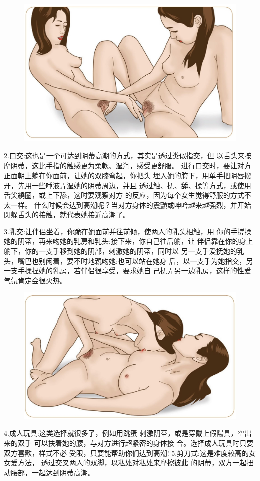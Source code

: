 \documentclass[12pt,UTF8]{ctexbook}
\begin{document}
\begin{figure}[htbp]
	\centering
	\includegraphics[width=0.7\linewidth]{10}
	\caption{}
	\label{fig:1}
\end{figure}

2.口交:这也是一个可达到阴蒂高潮的方式，其实是透过类似指交，但
以舌头来按摩阴蒂，这比手指的触感更为柔軟、湿润，感受更舒服。
进行口交时，要让对方正面朝上躺在你面前，让她的双膝弯起，你把头
埋入她的胯下，用单手把阴唇撥开，先用一些唾液弄湿她的阴蒂周边，并且
透过触、抚、舔、揉等方式，或使用舌尖繞圈，或上下舔，这时要观察对方
的反应，因为每个女生觉得舒服的方式不太一样。
什么时候会达到高潮呢？当对方身体的震顫或呻吟越来越强烈，并开始
閃躲舌头的接触，就代表她接近高潮了。

3.乳交:让伴侣坐着，你跪在她面前并往前倾，使两人的乳头相触，用
你的手搓揉她的阴蒂，再来吻她的乳房和乳头;接下来，你自己往后躺，让
伴侣靠在你的身上躺下，你的一支手移到她的阴部，刺激她的阴蒂，同时以
另一支手爱抚她的乳头，嘴巴也别闲着，要不时地親吻她;也可以站在她身
后，以一支手为她指交，另一支手揉捏她的乳房，若伴侣很享受，要求她自
己抚弄另一边乳房，这样的性爱气氛肯定会很火热。

\begin{figure}[htbp]
	\centering
	\includegraphics[width=0.7\linewidth]{11}
	\caption{}
	\label{fig:1}
\end{figure}

4.成人玩具:这类选择就很多了，例如用跳蛋
刺激阴蒂，或是穿戴上假陽具，空出来的双手
可以扶着她的腰，与对方进行超紧密的身体接
合。选择成人玩具时只要双方喜歡，样式不必
受限，只要能帮助你们达到高潮!
5.剪刀式:这是难度较高的女女爱方法，
透过交叉两人的双脚，以私处对私处来摩擦彼此
的阴蒂，双方一起扭动腰部，一起达到阴蒂高潮。
\end{document}
